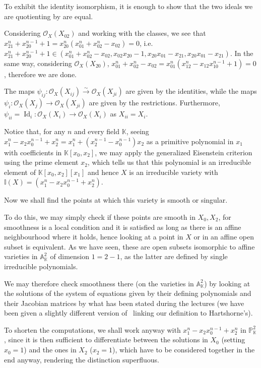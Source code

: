 \documentclass{article}
\newcommand{\numberset}{\mathbb}
\newcommand{\K}{\numberset{K}}
\newcommand{\I}{\mathbb{I}}
\newcommand{\A}{\mathbb{A}}
\newcommand{\Ps}{\mathbb{P}}
\DeclareMathOperator{\Id}{Id}
\begin{document}
To exhibit the identity isomorphism, it is enough to show that the two ideals we are quotienting by are equal.

Considering $\mathcal{O}_X(X_{02})$ and working with the classes, we see that $x_{21}^n+x_{20}^{n-1}+1=x_{20}^n(x_{01}^n+x_{02}^n-x_{02})=0$, i.e. $x_{21}^n+x_{20}^{n-1}+1\in(x_{01}^n+x_{02}^n-x_{02},x_{02}x_{20}-1,x_{20}x_{01}-x_{21},x_{20}x_{01}-x_{21})$. In the same way, considering $\mathcal{O}_X(X_{20})$, $x_{01}^n+x_{02}^n-x_{02}=x_{01}^n(x_{12}^n-x_{12}x_{10}^{n-1}+1)=0$, therefore we are done.

The maps $\psi_{ij}:\mathcal{O}_X(X_{ij})\xrightarrow{\sim}\mathcal{O}_X(X_{ji})$ are given by the identities, while the maps $\psi_i:\mathcal{O}_{X}(X_j)\rightarrow\mathcal{O}_{X}(X_{ji})$ are given by the restrictions. Furthermore, $\psi_{ii}=\Id_i:\mathcal{O}_X(X_i)\rightarrow\mathcal{O}_X(X_i)$ as $X_{ii}=X_i$.

Notice that, for any $n$ and every field $\K$, seeing $x_1^n-x_2x_0^{n-1}+x_2^n=x_1^n+(x_2^{n-1}-x_0^{n-1})x_2$ as a primitive polynomial in $x_1$ with coefficients in $\K[x_0,x_2]$, we may apply the generalized Eisenstein criterion using the prime element $x_2$, which tells us that this polynomial is an irreducible element of $\K[x_0,x_2][x_1]$ and hence $X$ is an irreducible variety with $\I(X)=(x_1^n-x_2x_0^{n-1}+x_2^n)$.

Now we shall find the points at which this variety is smooth or singular.

To do this, we may simply check if these points are smooth in $X_0,X_2$, for smoothness is a local condition and it is satisfied as long as there is an affine neighbourhood where it holds, hence looking at a point in $X$ or in an affine open subset is equivalent. As we have seen, these are open subsets isomorphic to affine varieties in $\A^2_{\K}$ of dimension $1=2-1$, as the latter are defined by single irreducible polynomials.

We may therefore check smoothness there (on the varieties in $\A^2_{\K}$) by looking at the solutions of the system of equations given by their defining polynomials and their Jacobian matrices by what has been stated during the lectures (we have been given a slightly different version of~\cite[thm. 6.4.5]{edix} linking our definition to Hartshorne's).

To shorten the computations, we shall work anyway with $x_1^n-x_2x_0^{n-1}+x_2^n$ in $\Ps^2_{\K}$, since it is then sufficient to differentiate between the solutions in $X_0$ (setting $x_0=1$) and the ones in $X_2$ ($x_2=1$), which have to be considered together in the end anyway, rendering the distinction superfluous.
\end{document}
